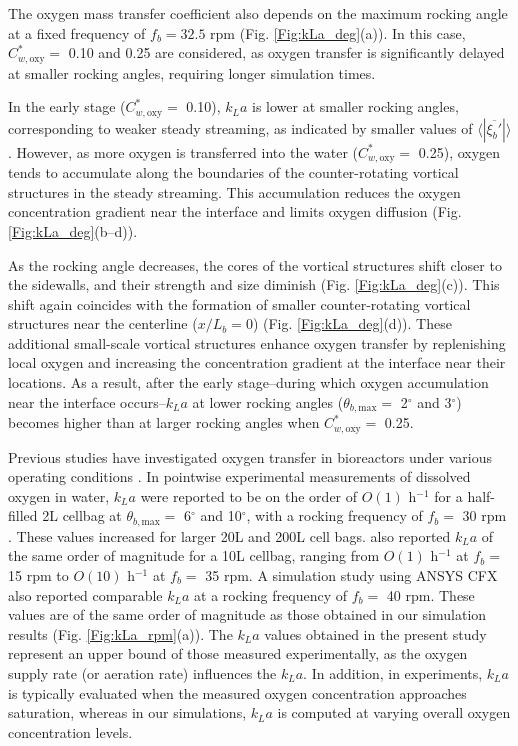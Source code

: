 \documentclass[final,3p,times,twocolumn,authoryear]{elsarticle}
\theoremstyle{definition}
\begin{document}
The oxygen mass transfer coefficient also depends on the maximum rocking angle at a fixed frequency of $f_b=32.5$ rpm (Fig. \ref{Fig:kLa_deg}(a)). In this case, $C_{w,\textrm{oxy}}^*=$ 0.10 and 0.25 are considered, as oxygen transfer is significantly delayed at smaller rocking angles, requiring longer simulation times. 

In the early stage ($C_{w,\textrm{oxy}}^*=$ 0.10), $k_La$ is lower at smaller rocking angles, corresponding to weaker steady streaming, as indicated by smaller values of $\langle |\overline{\xi_b'}| \rangle$. However, as more oxygen is transferred into the water ($C_{w,\textrm{oxy}}^*=$ 0.25), oxygen tends to accumulate along the boundaries of the counter-rotating vortical structures in the steady streaming. This accumulation reduces the oxygen concentration gradient near the interface and limits oxygen diffusion (Fig. \ref{Fig:kLa_deg}(b--d)). 

As the rocking angle decreases, the cores of the vortical structures shift closer to the sidewalls, and their strength and size diminish (Fig. \ref{Fig:kLa_deg}(c)). This shift again coincides with the formation of smaller counter-rotating vortical structures near the centerline ($x/L_b=0$) (Fig. \ref{Fig:kLa_deg}(d)). These additional small-scale vortical structures enhance oxygen transfer by replenishing local oxygen and increasing the concentration gradient at the interface near their locations. As a result, after the early stage--during which oxygen accumulation near the interface occurs--$k_La$ at lower rocking angles ($\theta_{b,\textrm{max}}=$ 2$^\circ$ and 3$^\circ$) becomes higher than at larger rocking angles when $C_{w,\textrm{oxy}}^*=$ 0.25.


Previous studies have investigated oxygen transfer in bioreactors under various operating conditions \citep{Eibl2003,Mikola2007,Junne2013,Zhan2019,Bai2019b,Svay2020}. In pointwise experimental measurements of dissolved oxygen in water, $k_La$ were reported to be on the order of $O(1)$ h$^{-1}$ for a half-filled 2L cellbag at $\theta_{b,\textrm{max}}=$ 6$^\circ$ and 10$^\circ$, with a rocking frequency of $f_b=$ 30 rpm \citep{Eibl2003}. These values increased for larger 20L and 200L cell bags. \citet{Junne2013} also reported $k_La$ of the same order of magnitude for a 10L cellbag, ranging from $O(1)$ h$^{-1}$ at $f_b=$ 15 rpm to $O(10)$ h$^{-1}$ at $f_b=$ 35 rpm. A simulation study using ANSYS CFX \citep{Svay2020} also reported comparable $k_La$ at a rocking frequency of $f_b=$ 40 rpm. These values are of the same order of magnitude as those obtained in our simulation results (Fig. \ref{Fig:kLa_rpm}(a)). The $k_La$ values obtained in the present study represent an upper bound of those measured experimentally, as the oxygen supply rate (or aeration rate) influences the $k_La$. In addition, in experiments, $k_La$ is typically evaluated when the measured oxygen concentration approaches saturation, whereas in our simulations, $k_La$ is computed at varying overall oxygen concentration levels. 
\end{document}
